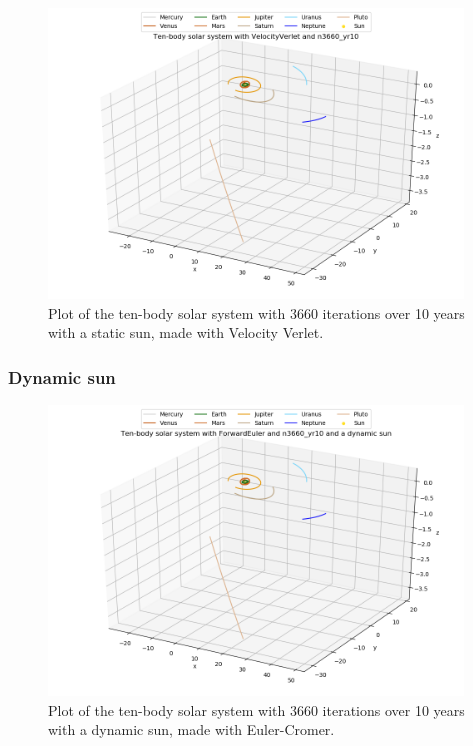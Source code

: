 \documentclass{article}
\begin{document}
    \begin{figure}[H]
        \centering
        \includegraphics[width = 11cm]{img/plot3D_10body_V_n3660_yr10.png}
        \caption{Plot of the ten-body solar system with 3660 iterations over 10 years with a static sun, made with Velocity Verlet.}
        \label{fig:plot3D_10body_V_n3660_yr10}
    \end{figure}

\subsubsection{Dynamic sun}

    \begin{figure}[H]
        \centering
        \includegraphics[width = 11cm]{img/plot3D_10body_F_n3660_yr10_dynamic_sun.png}
        \caption{Plot of the ten-body solar system with 3660 iterations over 10 years with a dynamic sun, made with Euler-Cromer.}
        \label{fig:plot3D_10body_F_n3660_yr10_dynamic_sun}
    \end{figure}
\end{document}
